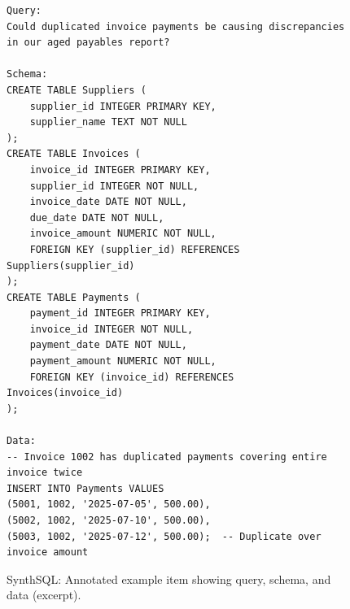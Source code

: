 \documentclass[11pt]{article}
\newcommand{\synthsubset}{SynthSQL\xspace}
\begin{document}
\begin{figure}[t]
\small\centering
\begin{verbatim}
Query:
Could duplicated invoice payments be causing discrepancies in our aged payables report?

Schema:
CREATE TABLE Suppliers (
    supplier_id INTEGER PRIMARY KEY,
    supplier_name TEXT NOT NULL
);
CREATE TABLE Invoices (
    invoice_id INTEGER PRIMARY KEY,
    supplier_id INTEGER NOT NULL,
    invoice_date DATE NOT NULL,
    due_date DATE NOT NULL,
    invoice_amount NUMERIC NOT NULL,
    FOREIGN KEY (supplier_id) REFERENCES Suppliers(supplier_id)
);
CREATE TABLE Payments (
    payment_id INTEGER PRIMARY KEY,
    invoice_id INTEGER NOT NULL,
    payment_date DATE NOT NULL,
    payment_amount NUMERIC NOT NULL,
    FOREIGN KEY (invoice_id) REFERENCES Invoices(invoice_id)
);

Data:
-- Invoice 1002 has duplicated payments covering entire invoice twice
INSERT INTO Payments VALUES
(5001, 1002, '2025-07-05', 500.00),
(5002, 1002, '2025-07-10', 500.00),
(5003, 1002, '2025-07-12', 500.00);  -- Duplicate over invoice amount
\end{verbatim}
\caption{\synthsubset: Annotated example item showing query, schema, and data (excerpt).}
\label{fig:example-item}
\end{figure}
\end{document}
